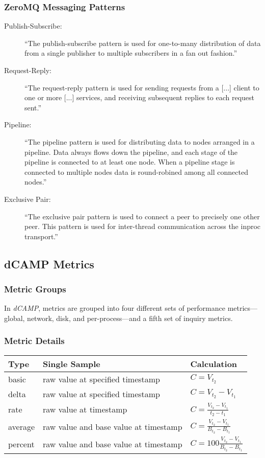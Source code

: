 \documentclass{beamer}
\newcommand{\dcampns}{\emph{dCAMP}}
\begin{document}
\begin{frame}
\frametitle{ZeroMQ Messaging Patterns}
\begin{description}

\item[Publish-Subscribe:]
``The publish-subscribe pattern is used for one-to-many distribution of data from a single publisher to multiple
subscribers in a fan out fashion.''

\item[Request-Reply:]
``The request-reply pattern is used for sending requests from a [...] client to one or more [...] services, and receiving
subsequent replies to each request sent.''

\item[Pipeline:]
``The pipeline pattern is used for distributing data to nodes arranged in a pipeline. Data always flows down the
pipeline, and each stage of the pipeline is connected to at least one node. When a pipeline stage is connected to
multiple nodes data is round-robined among all connected nodes.''

\item[Exclusive Pair:]
``The exclusive pair pattern is used to connect a peer to precisely one other peer. This pattern is used for inter-thread
communication across the inproc transport.''
\end{description}
\end{frame}

\subsection{dCAMP Metrics}

\begin{frame}
\frametitle{Metric Groups}
In \dcampns, metrics are grouped into four different sets of performance metrics---global, network, disk, and
per-process---and a fifth set of inquiry metrics.
\end{frame}

\begin{frame}
\frametitle{Metric Details}
\renewcommand{\arraystretch}{1.5}
\begin{table}
\begin{tabular}{ l|l|l }
\hline
\textbf{Type} & \textbf{Single Sample} & \textbf{Calculation}
\tabularnewline
\hline
basic & raw value at specified timestamp & \( C = V_{t_2} \)
\tabularnewline
delta & raw value at specified timestamp & \( C = V_{t_2} - V_{t_1} \)
\tabularnewline
rate & raw value at timestamp & \( C = \frac{V_{t_2} - V_{t_1}}{t_2 - t_1} \)
\tabularnewline
average & raw value and base value at timestamp & \( C = \frac{V_{t_2} - V_{t_1}}{B_{t_2} - B_{t_1}} \)
\tabularnewline
percent & raw value and base value at timestamp & \( C = 100 \frac{V_{t_2} - V_{t_1}}{B_{t_2} - B_{t_1}} \)
\tabularnewline
\end{tabular}
\end{table}
\end{frame}
\end{document}
